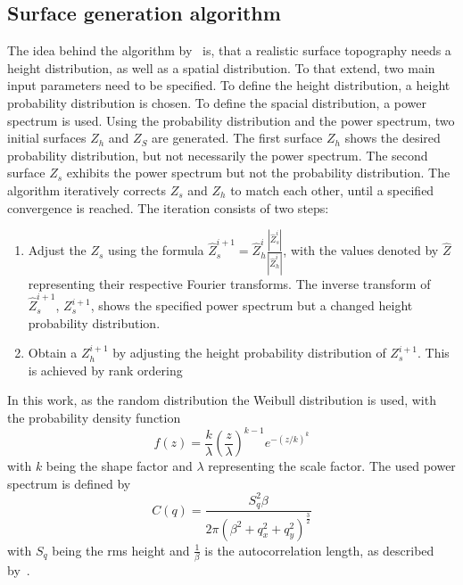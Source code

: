 \subsection{Surface generation algorithm}\label{subsec: Surface generation algorithm}
The idea behind the algorithm by~\cite{perez-rafolsGeneratingRandomlyRough2019} is, that a realistic surface topography needs a height distribution, as well as a spatial distribution.
To that extend, two main input parameters need to be specified.
To define the height distribution, a height probability distribution is chosen.
To define the spacial distribution, a power spectrum is used.
Using the probability distribution and the power spectrum, two initial surfaces $Z_h$ and $Z_S$ are generated. 
The first surface $Z_h$ shows the desired probability distribution, but not necessarily the power spectrum.
The second surface $Z_s$ exhibits the power spectrum but not the probability distribution.
The algorithm iteratively corrects $Z_s$ and $Z_h$ to match each other, until a specified convergence is reached.
The iteration consists of two steps:
\begin{enumerate}
    \item Adjust the $Z_s$ using the formula $\hat{Z}_s^{i+1} = \hat{Z}_h^i \frac{|\hat{Z}_s^i|}{|\hat{Z}_h^i|}$, with the values denoted by $\hat{Z}$ representing their respective Fourier transforms.
    The inverse transform of $\hat{Z}_s^{i+1}$, $Z_s^{i+1}$, shows the specified power spectrum but a changed height probability distribution.
    \item Obtain a $Z_h^{i+1}$ by adjusting the height probability distribution of $Z_s^{i+1}$.
    This is achieved by rank ordering
\end{enumerate}
In this work, as the random distribution the Weibull distribution is used, with the probability density function
\begin{equation}\label{eq: Weibull distribution}
    f(z) = \frac{k}{\lambda} \left(\frac{z}{\lambda}\right)^{k-1} e^{-(z/k)^{k}}
\end{equation}
with $k$ being the shape factor and $\lambda$ representing the scale factor.
The used power spectrum is defined by
\begin{equation}\label{eq: Power spectrum}
    C(q) = \frac{S_q^2 \beta}{2\pi\left(\beta^2 + q_x^2+q_y^2\right)^{\frac{3}{2}}}
\end{equation}
with $S_q$ being the rms height and $\frac{1}{\beta}$ is the autocorrelation length, as described by~\cite{perez-rafolsGeneratingRandomlyRough2019}.
